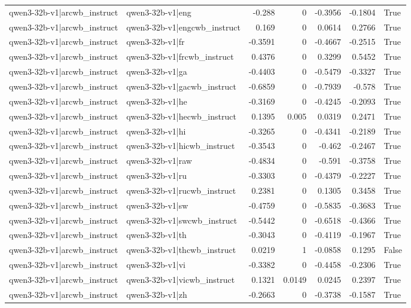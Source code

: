 \begin{table}
\begin{tabular}{l l r r r r l}
qwen3-32b-v1|arcwb_instruct & qwen3-32b-v1|eng & -0.288 & 0 & -0.3956 & -0.1804 & True \\
qwen3-32b-v1|arcwb_instruct & qwen3-32b-v1|engcwb_instruct & 0.169 & 0 & 0.0614 & 0.2766 & True \\
qwen3-32b-v1|arcwb_instruct & qwen3-32b-v1|fr & -0.3591 & 0 & -0.4667 & -0.2515 & True \\
qwen3-32b-v1|arcwb_instruct & qwen3-32b-v1|frcwb_instruct & 0.4376 & 0 & 0.3299 & 0.5452 & True \\
qwen3-32b-v1|arcwb_instruct & qwen3-32b-v1|ga & -0.4403 & 0 & -0.5479 & -0.3327 & True \\
qwen3-32b-v1|arcwb_instruct & qwen3-32b-v1|gacwb_instruct & -0.6859 & 0 & -0.7939 & -0.578 & True \\
qwen3-32b-v1|arcwb_instruct & qwen3-32b-v1|he & -0.3169 & 0 & -0.4245 & -0.2093 & True \\
qwen3-32b-v1|arcwb_instruct & qwen3-32b-v1|hecwb_instruct & 0.1395 & 0.005 & 0.0319 & 0.2471 & True \\
qwen3-32b-v1|arcwb_instruct & qwen3-32b-v1|hi & -0.3265 & 0 & -0.4341 & -0.2189 & True \\
qwen3-32b-v1|arcwb_instruct & qwen3-32b-v1|hicwb_instruct & -0.3543 & 0 & -0.462 & -0.2467 & True \\
qwen3-32b-v1|arcwb_instruct & qwen3-32b-v1|raw & -0.4834 & 0 & -0.591 & -0.3758 & True \\
qwen3-32b-v1|arcwb_instruct & qwen3-32b-v1|ru & -0.3303 & 0 & -0.4379 & -0.2227 & True \\
qwen3-32b-v1|arcwb_instruct & qwen3-32b-v1|rucwb_instruct & 0.2381 & 0 & 0.1305 & 0.3458 & True \\
qwen3-32b-v1|arcwb_instruct & qwen3-32b-v1|sw & -0.4759 & 0 & -0.5835 & -0.3683 & True \\
qwen3-32b-v1|arcwb_instruct & qwen3-32b-v1|swcwb_instruct & -0.5442 & 0 & -0.6518 & -0.4366 & True \\
qwen3-32b-v1|arcwb_instruct & qwen3-32b-v1|th & -0.3043 & 0 & -0.4119 & -0.1967 & True \\
qwen3-32b-v1|arcwb_instruct & qwen3-32b-v1|thcwb_instruct & 0.0219 & 1 & -0.0858 & 0.1295 & False \\
qwen3-32b-v1|arcwb_instruct & qwen3-32b-v1|vi & -0.3382 & 0 & -0.4458 & -0.2306 & True \\
qwen3-32b-v1|arcwb_instruct & qwen3-32b-v1|vicwb_instruct & 0.1321 & 0.0149 & 0.0245 & 0.2397 & True \\
qwen3-32b-v1|arcwb_instruct & qwen3-32b-v1|zh & -0.2663 & 0 & -0.3738 & -0.1587 & True \\

\end{tabular}
\end{table}

